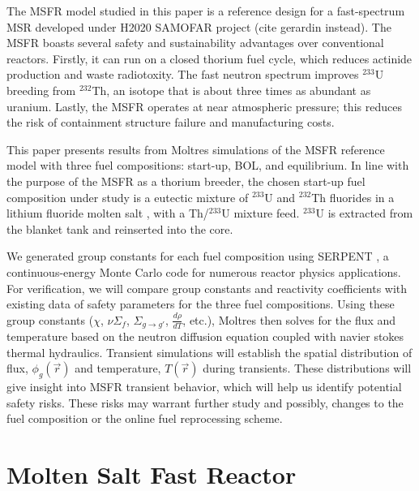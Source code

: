 \documentclass{anstrans}
\begin{document}
    The \gls{MSFR} model studied in this paper is a reference design for a 
    fast-spectrum \gls{MSR} developed under H2020
    \gls{SAMOFAR} project \cite{serp_molten_2014} (cite gerardin instead).
    The \gls{MSFR} boasts several safety and sustainability advantages over
    conventional reactors. Firstly, it can run on a closed thorium fuel cycle,
    which reduces actinide production and waste radiotoxity.
    The fast neutron spectrum improves $^{233}$U breeding from $^{232}$Th, an
    isotope that is about three times as abundant as uranium.
    Lastly, the \gls{MSFR} operates at near atmospheric pressure; this reduces
    the risk of containment structure failure and manufacturing costs.
    
    This paper presents results from Moltres simulations of the 
    \gls{MSFR} reference model with three fuel compositions:
    start-up, \gls{BOL}, and equilibrium. In line with the purpose of the
    \gls{MSFR} as a thorium breeder, the chosen start-up fuel composition
    under study is a eutectic mixture of $^{233}$U and 
    $^{232}$Th fluorides in a lithium fluoride molten salt 
    \cite{merle-lucotte_launching_2011}, with
    a Th/$^{233}$U mixture feed. $^{233}$U is extracted from
    the blanket tank and reinserted into the core.
    
    We generated group constants for 
    each fuel composition using SERPENT \cite{leppanen_serpent_2015}, a 
    continuous-energy Monte Carlo code for numerous reactor physics 
    applications. For verification, we will compare group constants and
    reactivity coefficients with existing data 
    \cite{fiorina_analysis_2012,fiorina_investigation_2013} of safety 
    parameters for the three fuel compositions.  
    Using these group constants ($\chi$, $\nu\Sigma_f$, 
    $\Sigma_{g\rightarrow g'}$, $\frac{d\rho}{dT}$, etc.), Moltres then 
    solves for the flux and temperature based on the neutron diffusion 
    equation coupled with navier stokes thermal hydraulics. Transient 
    simulations will establish the spatial distribution of flux, 
    $\phi_g(\vec{r})$ and temperature, $T(\vec{r})$ during transients.
    These distributions will give insight into MSFR transient behavior,
    which will help us identify potential safety risks.
    These risks may warrant further study and possibly, changes to the
    fuel composition or the online fuel reprocessing scheme.
    
\section{Molten Salt Fast Reactor}
\end{document}

